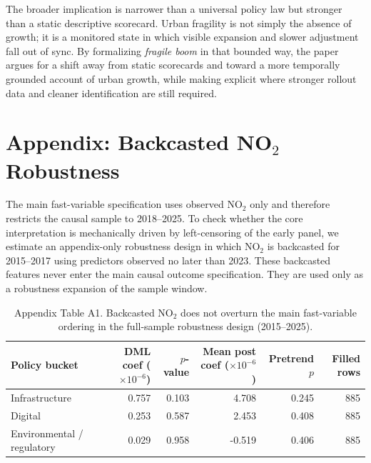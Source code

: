 \documentclass[11pt,a4paper]{article}
\begin{document}
The broader implication is narrower than a universal policy law but stronger than a static descriptive scorecard.
Urban fragility is not simply the absence of growth; it is a monitored state in which visible expansion and slower adjustment fall out of sync.
By formalizing \emph{fragile boom} in that bounded way, the paper argues for a shift away from static scorecards and toward a more temporally grounded account of urban growth, while making explicit where stronger rollout data and cleaner identification are still required.


\appendix
\section{Appendix: Backcasted NO$_2$ Robustness}
\label{app:no2_backcast}

The main fast-variable specification uses observed NO$_2$ only and therefore restricts the causal sample to 2018--2025.
To check whether the core interpretation is mechanically driven by left-censoring of the early panel, we estimate an appendix-only robustness design in which NO$_2$ is backcasted for 2015--2017 using predictors observed no later than 2023.
These backcasted features never enter the main causal outcome specification.
They are used only as a robustness expansion of the sample window.

\begin{table}[H]
\centering
\caption{Appendix Table A1. Backcasted NO$_2$ does not overturn the main fast-variable ordering in the full-sample robustness design (2015--2025).}
\label{tab:no2_backcast_appendix}
\small
\setlength{\tabcolsep}{5pt}
\begin{tabular}{lrrrrr}
\toprule
Policy bucket & DML coef ($\times 10^{-6}$) & $p$-value & Mean post coef ($\times 10^{-6}$) & Pretrend $p$ & Filled rows \\
\midrule
Infrastructure & 0.757 & 0.103 & 4.708 & 0.245 & 885 \\
Digital & 0.253 & 0.587 & 2.453 & 0.408 & 885 \\
Environmental / regulatory & 0.029 & 0.958 & -0.519 & 0.406 & 885 \\
\bottomrule
\end{tabular}
\end{table}
\FloatBarrier
\end{document}
